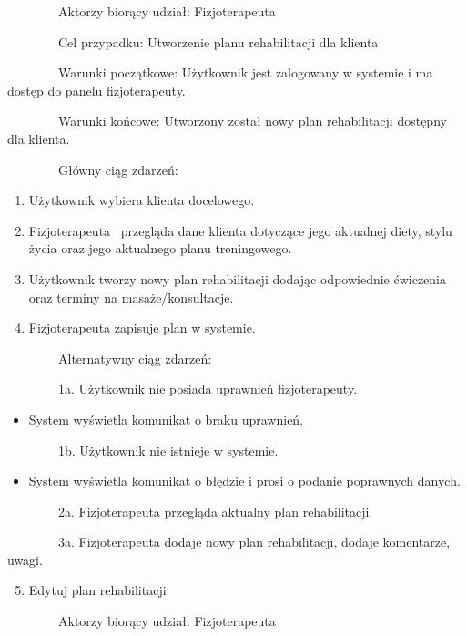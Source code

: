 {~~~~~~~~}{Aktorzy biorący udział: Fizjoterapeuta}

{~~~~~~~~Cel przypadku: Utworzenie planu rehabilitacji dla klienta}

{~~~~~~~~Warunki początkowe: Użytkownik jest zalogowany w systemie i ma
dostęp do panelu fizjoterapeuty.}

{~~~~~~~~Warunki końcowe: Utworzony został nowy plan rehabilitacji
dostępny dla klienta.}

{~~~~~~~~Główny ciąg zdarzeń:}

\begin{enumerate}
\tightlist
\item
  {Użytkownik wybiera klienta docelowego.}
\item
  {Fizjoterapeuta ~przegląda dane klienta dotyczące jego aktualnej
  diety, stylu życia oraz jego aktualnego planu treningowego.}
\item
  {Użytkownik tworzy nowy plan rehabilitacji dodając odpowiednie
  ćwiczenia oraz terminy na masaże/konsultacje.}
\item
  {Fizjoterapeuta zapisuje plan w systemie.}
\end{enumerate}

{~~~~~~~~Alternatywny ciąg zdarzeń:}

{~~~~~~~~1a. Użytkownik nie posiada uprawnień fizjoterapeuty.}

\begin{itemize}
\tightlist
\item
  {System wyświetla komunikat o braku uprawnień.}
\end{itemize}

{~~~~~~~~1b. Użytkownik nie istnieje w systemie.}

\begin{itemize}
\tightlist
\item
  {System wyświetla komunikat o błędzie i prosi o podanie poprawnych
  danych.}
\end{itemize}

{~~~~~~~~2a. Fizjoterapeuta przegląda aktualny plan rehabilitacji.}

{~~~~~~~~3a. Fizjoterapeuta dodaje nowy plan rehabilitacji, dodaje
komentarze, uwagi.}

{}

\begin{enumerate}
\setcounter{enumi}{4}
\tightlist
\item
  {Edytuj plan rehabilitacji}
\end{enumerate}

{~~~~~~~~}{Aktorzy biorący udział: Fizjoterapeuta}

